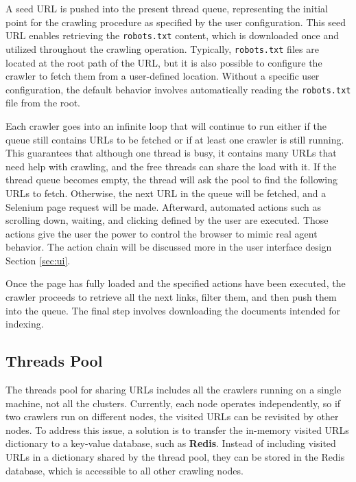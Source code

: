 A seed URL is pushed into the present thread queue, representing the initial point for the crawling procedure as specified by the user configuration. This seed URL enables retrieving the \texttt{robots.txt} content, which is downloaded once and utilized throughout the crawling operation. Typically, \texttt{robots.txt} files are located at the root path of the URL, but it is also possible to configure the crawler to fetch them from a user-defined location. Without a specific user configuration, the default behavior involves automatically reading the \texttt{robots.txt} file from the root.

Each crawler goes into an infinite loop that will continue to run either if the queue still contains URLs to be fetched or if at least one crawler is still running. This guarantees that although one thread is busy, it contains many URLs that need help with crawling, and the free threads can share the load with it. If the thread queue becomes empty, the thread will ask the pool to find the following URLs to fetch. Otherwise, the next URL in the queue will be fetched, and a Selenium page request will be made. Afterward, automated actions such as scrolling down, waiting, and clicking defined by the user are executed. Those actions give the user the power to control the browser to mimic real agent behavior. The action chain will be discussed more in the user interface design Section \ref{sec:ui}.    

Once the page has fully loaded and the specified actions have been executed, the crawler proceeds to retrieve all the next links, filter them, and then push them into the queue. The final step involves downloading the documents intended for indexing.

\subsection{Threads Pool}\label{sec:threads-pool}
The threads pool for sharing URLs includes all the crawlers running on a single machine, not all the clusters. Currently, each node operates independently, so if two crawlers run on different nodes, the visited URLs can be revisited by other nodes. To address this issue, a solution is to transfer the in-memory visited URLs dictionary to a key-value database, such as \textbf{Redis}. Instead of including visited URLs in a dictionary shared by the thread pool, they can be stored in the Redis database, which is accessible to all other crawling nodes.

